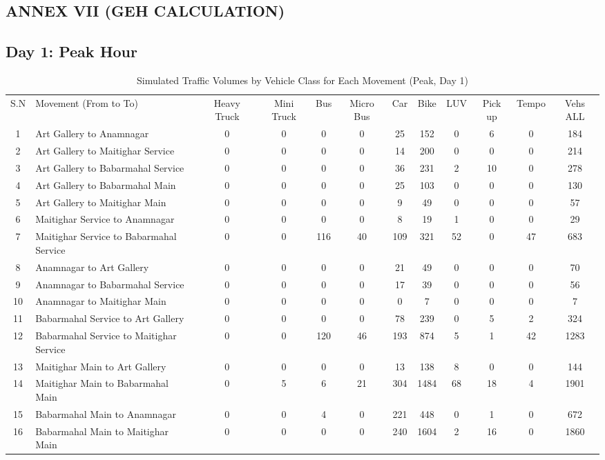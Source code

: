 \begin{landscape}
\chapter{ANNEX VII (GEH CALCULATION)}
\section{Day 1: Peak Hour}
\begin{table}[h!]
\centering
\caption{Simulated Traffic Volumes by Vehicle Class for Each Movement (Peak, Day 1)}
\small
\setlength{\tabcolsep}{5pt}

\begin{tabular}{|c|p{6cm}|c|c|c|c|c|c|c|c|c|c|}
\hline
S.N& Movement (From to To)& Heavy Truck & Mini Truck & Bus & Micro Bus & Car & Bike & LUV & Pick up & Tempo & Vehs ALL \\
1	&Art Gallery to Anamnagar	            &0	&0	&0	&0	&25	&152    &0	    &6	&0	&184 \\ \hline
2	&Art Gallery to Maitighar Service	    &0	&0	&0	&0	&14	&200    &0	    &0	&0	&214 \\ \hline
3	&Art Gallery to Babarmahal Service	    &0	&0	&0	&0	&36	&231    &2	    &10&	0&	278 \\ \hline
4	&Art Gallery to Babarmahal Main	        &0	&0	&0	&0	&25	&103    &0	    &0	&0	&130 \\ \hline
5	&Art Gallery to Maitighar Main	        &0	&0	&0	&0	&9	&49	    &0	    &0	&0	&57 \\ \hline
6	&Maitighar Service to Anamnagar	        &0	&0	&0	&0	&8	&19	    &1	    &0	&0	&29 \\ \hline
7	&Maitighar Service to Babarmahal Service	&0	&0	&116	&40	&109    &321	&52 &0	&47	&683 \\ \hline
8	&Anamnagar to Art Gallery	            &0	&0	&0	&0	&21	&49	    &0	    &0	&0	&70 \\ \hline
9	&Anamnagar to Babarmahal Service	        &0	&0	&0	&0	&17	&39	    &0	    &0	&0	&56 \\ \hline
10	&Anamnagar to Maitighar Main	            &0	&0	&0	&0	&0	&7	    &0	    &0	&0	&7 \\ \hline
11	&Babarmahal Service to Art Gallery	    &0	&0	&0	&0	&78	&239    &0	    &5	&2	&324 \\ \hline
12	&Babarmahal Service to Maitighar Service	&0	&0	&120	&46	&193    &874	&5	&1	&42	&1283 \\ \hline
13	&Maitighar Main to Art Gallery	        &0	&0	&0	&0	&13	&138    &8	    &0	&0	&144 \\ \hline
14	&Maitighar Main to Babarmahal Main	    &0	&5	&6	&21	&304	&1484   &68 &18	&4	&1901 \\ \hline
15	&Babarmahal Main to Anamnagar	        &0	&0	&4	&0	&221	&448    &0	    &1	&0	&672 \\ \hline
16	&Babarmahal Main to Maitighar Main	    &0	&0	&0	&0	&240	&1604   &2	    &16    &0&	1860 \\ \hline

\end{tabular}
\end{table}
\end{landscape}


